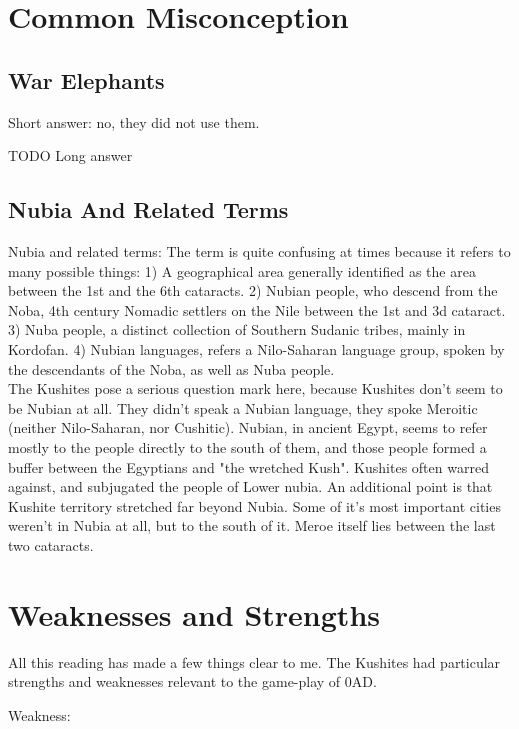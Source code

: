\documentclass[a4paper,12pt]{scrreprt}
\begin{document}
\section{Common Misconception}

\subsection{War Elephants}

Short answer: no, they did not use them.

TODO Long answer

\subsection{Nubia And Related Terms}

Nubia and related terms: The term is quite confusing at times because it refers to many possible things: 1) A geographical area generally identified as the area between the 1st and the 6th cataracts. 2) Nubian people, who descend from the Noba, 4th century Nomadic settlers on the Nile between the 1st and 3d cataract. 3) Nuba people, a distinct collection of Southern Sudanic tribes, mainly in Kordofan. 4) Nubian languages, refers a Nilo-Saharan language group, spoken by the descendants of the Noba, as well as Nuba people.\\  

The Kushites pose a serious question mark here, because Kushites don't seem to be Nubian at all. They didn't speak a Nubian language, they spoke Meroitic (neither Nilo-Saharan, nor Cushitic). Nubian, in ancient Egypt, seems to refer mostly to the people directly to the south of them, and those people formed a buffer between the Egyptians and "the wretched Kush". Kushites often warred against, and subjugated the people of Lower nubia. An additional point is that Kushite territory stretched far beyond Nubia. Some of it's most important cities weren't in Nubia at all, but to the south of it. Meroe itself lies between the last two cataracts. 

\section{Weaknesses and Strengths}

All this reading has made a few things clear to me. The Kushites had particular strengths and weaknesses relevant to the game-play of 0AD.

Weakness:
\end{document}
